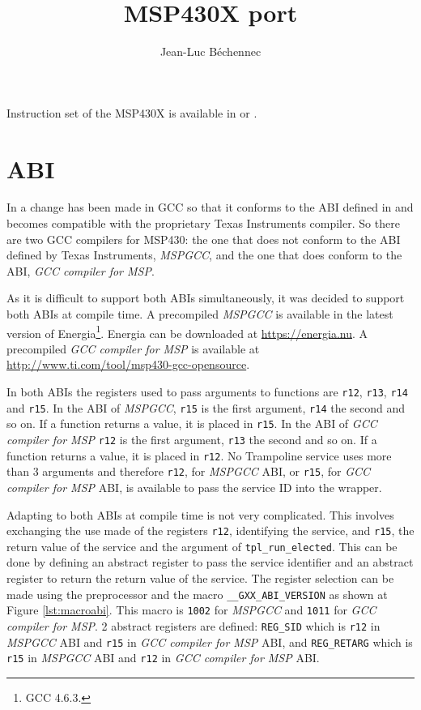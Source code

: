 \documentclass[11pt, oneside]{article}   	%
\title{MSP430X port}
\author{Jean-Luc Béchennec}
\begin{document}
\maketitle

Instruction set of the MSP430X is available in \cite{slau208q} or \cite{slau367o}.

\section{ABI}

In \cite{slaa664} a change has been made in GCC so that it conforms to the ABI defined in \cite{slaa534} and becomes compatible with the proprietary Texas Instruments compiler. So there are two GCC compilers for MSP430: the one that does not conform to the ABI defined by Texas Instruments, \emph{MSPGCC}, and the one that does conform to the ABI, \emph{GCC compiler for MSP}. 

As it is difficult to support both ABIs simultaneously, it was decided to support both ABIs at compile time. A precompiled \emph{MSPGCC} is available in the latest version of Energia\footnote{GCC 4.6.3.}. Energia can be downloaded at {\small\url{https://energia.nu}}. A precompiled \emph{GCC compiler for MSP} is available at {\small\url{http://www.ti.com/tool/msp430-gcc-opensource}}.

In both ABIs the registers used to pass arguments to functions are \lstinline{r12}, \lstinline{r13}, \lstinline{r14} and \lstinline{r15}. In the ABI of \emph{MSPGCC}, \lstinline{r15} is the first argument, \lstinline{r14} the second and so on. If a function returns a value, it is placed in \lstinline{r15}. In the ABI of \emph{GCC compiler for MSP} \lstinline{r12} is the first argument, \lstinline{r13} the second and so on. If a function returns a value, it is placed in \lstinline{r12}.
 No Trampoline service uses more than 3 arguments and therefore \lstinline{r12}, for \emph{MSPGCC} ABI, or \lstinline{r15}, for \emph{GCC compiler for MSP} ABI, is available to pass the service ID into the wrapper.
 
Adapting to both ABIs at compile time is not very complicated. This involves exchanging the use made of the registers \lstinline{r12}, identifying the service, and \lstinline{r15}, the return value of the service and the argument of \lstinline{tpl_run_elected}. This can be done by defining an abstract register to pass the service identifier and an abstract register to return the return value of the service. The register selection can be made using the preprocessor and the macro \lstinline{__GXX_ABI_VERSION} as shown at Figure \ref{lst:macroabi}. This macro is \lstinline{1002} for \emph{MSPGCC} and \lstinline{1011} for \emph{GCC compiler for MSP}. 2 abstract registers are defined: \lstinline{REG_SID} which is \lstinline{r12} in \emph{MSPGCC} ABI and \lstinline{r15} in \emph{GCC compiler for MSP} ABI, and \lstinline{REG_RETARG} which is \lstinline{r15} in \emph{MSPGCC} ABI and \lstinline{r12}  in \emph{GCC compiler for MSP} ABI.
\end{document}
